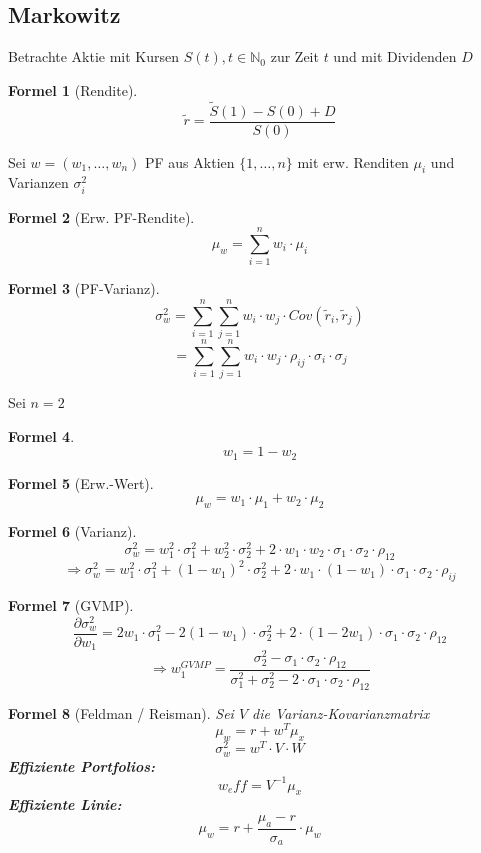 \documentclass[a4paper]{article}
\theoremstyle{break}
\newtheorem{formula}{Formel}[section]
\begin{document}
    \subsection{Markowitz}
    Betrachte Aktie mit Kursen $S(t), t \in \mathbb{N}_0$ zur Zeit $t$ und mit Dividenden $D$
    \begin{formula}[Rendite]
       $$\tilde{r}=\frac{\tilde{S}(1)-S(0)+D}{S(0)}$$
    \end{formula}
    Sei $w = (w_1, \dots, w_n)$ PF aus Aktien $\{1, \dots, n\}$ mit erw. Renditen $\mu_i$ und Varianzen  $\sigma^{2}_i$
    \begin{formula}[Erw. PF-Rendite]
        $$\mu_w = \sum_{i=1}^{n}w_i\cdot\mu_i$$
    \end{formula}
    \begin{formula}[PF-Varianz] 
        $$\sigma^{2}_w = \sum_{i=1}^{n}\sum_{j=1}^{n} w_i \cdot w_j \cdot Cov(\tilde{r}_i, \tilde{r}_j)$$
        $$=  \sum_{i=1}^{n}\sum_{j=1}^{n} w_i \cdot w_j \cdot \rho_{ij} \cdot \sigma_i \cdot \sigma_j$$
    \end{formula}
    Sei $n = 2$
    \begin{formula}
        $$w_1 = 1 - w_2$$
    \end{formula}
    \begin{formula}[Erw.-Wert]
        $$\mu_w = w_1 \cdot \mu_1 + w_2 \cdot \mu_2$$
    \end{formula}
    \begin{formula}[Varianz]
        $$\sigma^{2}_w = w^{2}_1 \cdot \sigma^{2}_1 + w^{2}_2 \cdot \sigma^{2}_2 + 2 \cdot w_1 \cdot w_2 \cdot \sigma_1 \cdot \sigma_2 \cdot \rho_{12}$$
        $$\Rightarrow \sigma^{2}_w = w^{2}_1 \cdot \sigma^{2}_1 + (1-w_1)^{2} \cdot \sigma^{2}_2 + 2 \cdot w_1 \cdot (1-w_1) \cdot \sigma_1 \cdot \sigma_2 \cdot \rho_{ij}$$
    \end{formula}
    \begin{formula}[GVMP]
        $$\frac{\partial\sigma^{2}_w}{\partial{}w_1} = 2w_1 \cdot \sigma^{2}_1 - 2(1-w_1) \cdot \sigma^{2}_2 + 2 \cdot (1 - 2w_1) \cdot \sigma_1 \cdot \sigma_2 \cdot \rho_{12}$$
        $$\Rightarrow w^{GVMP}_1 = \frac{\sigma^{2}_2 - \sigma_1 \cdot \sigma_2 \cdot \rho_{12}}{\sigma^{2}_1 + \sigma^{2}_2 - 2 \cdot \sigma_1  \cdot \sigma_2 \cdot \rho_{12}}$$
    \end{formula}
    \begin{formula}[Feldman / Reisman]
        Sei $V$ die Varianz-Kovarianzmatrix
        $$\mu_w = r + w^T\mu_x$$
        $$\sigma^{2}_w = w^T \cdot V \cdot W$$ 
        \textbf{Effiziente Portfolios:}
        $$w_eff = V^{-1}\mu_x$$
        \textbf{Effiziente Linie:}
        $$\mu_w  = r + \frac{\mu_a - r}{\sigma_a} \cdot \mu_w$$
    \end{formula}
\end{document}
